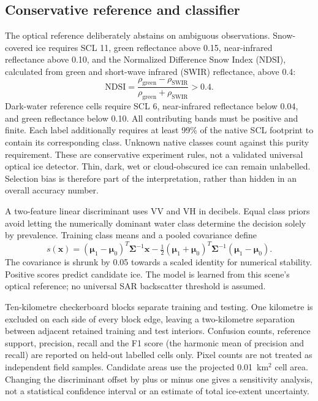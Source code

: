 \subsection{Conservative reference and classifier}

The optical reference deliberately abstains on ambiguous observations. Snow-covered ice
requires SCL 11, green reflectance above 0.15, near-infrared reflectance above 0.10, and
the Normalized Difference Snow Index (NDSI), calculated from green and short-wave infrared
(SWIR) reflectance, above 0.4:
\[
  \mathrm{NDSI}=\frac{\rho_{\mathrm{green}}-\rho_{\mathrm{SWIR}}}
                    {\rho_{\mathrm{green}}+\rho_{\mathrm{SWIR}}}>0.4.
\]
Dark-water reference cells require SCL 6, near-infrared reflectance below 0.04, and
green reflectance below 0.10. All contributing bands must be positive and finite.
Each label additionally requires at least 99\% of the native SCL footprint to contain
its corresponding class. Unknown native classes count against this purity requirement.
These are conservative experiment rules, not a validated universal optical ice detector.
Thin, dark, wet or cloud-obscured ice can remain unlabelled. Selection bias is therefore
part of the interpretation, rather than hidden in an overall accuracy number.

A two-feature linear discriminant uses VV and VH in decibels. Equal class priors avoid
letting the numerically dominant water class determine the decision solely by prevalence.
Training class means and a pooled covariance define
\[
  s(\mathbf{x})=(\boldsymbol{\mu}_1-\boldsymbol{\mu}_0)^T
  \boldsymbol{\Sigma}^{-1}\mathbf{x}
  -\tfrac12(\boldsymbol{\mu}_1+\boldsymbol{\mu}_0)^T
  \boldsymbol{\Sigma}^{-1}(\boldsymbol{\mu}_1-\boldsymbol{\mu}_0).
\]
The covariance is shrunk by 0.05 towards a scaled identity for numerical stability.
Positive scores predict candidate ice. The model is learned from this scene's optical
reference; no universal SAR backscatter threshold is assumed.

Ten-kilometre checkerboard blocks separate training and testing. One kilometre is excluded
on each side of every block edge, leaving a two-kilometre separation between adjacent
retained training and test interiors. Confusion counts, reference support, precision,
recall and the F1 score (the harmonic mean of precision and recall) are reported on
held-out labelled cells only. Pixel counts are not treated
as independent field samples. Candidate areas use the projected 0.01~km$^2$ cell area.
Changing the discriminant offset by plus or minus one gives a sensitivity analysis,
not a statistical confidence interval or an estimate of total ice-extent uncertainty.

